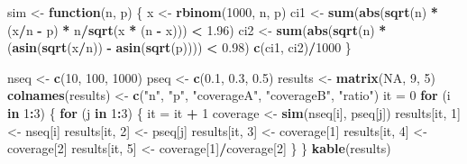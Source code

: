 \documentclass[12pt,]{article}
\newenvironment{Shaded}{\begin{snugshade}}{\end{snugshade}}
\newcommand{\ControlFlowTok}[1]{\textcolor[rgb]{0.13,0.29,0.53}{\textbf{#1}}}
\newcommand{\DecValTok}[1]{\textcolor[rgb]{0.00,0.00,0.81}{#1}}
\newcommand{\FloatTok}[1]{\textcolor[rgb]{0.00,0.00,0.81}{#1}}
\newcommand{\KeywordTok}[1]{\textcolor[rgb]{0.13,0.29,0.53}{\textbf{#1}}}
\newcommand{\NormalTok}[1]{#1}
\newcommand{\OperatorTok}[1]{\textcolor[rgb]{0.81,0.36,0.00}{\textbf{#1}}}
\newcommand{\OtherTok}[1]{\textcolor[rgb]{0.56,0.35,0.01}{#1}}
\newcommand{\StringTok}[1]{\textcolor[rgb]{0.31,0.60,0.02}{#1}}
\begin{document}
\begin{Shaded}
\begin{Highlighting}[]
\NormalTok{sim <-}\StringTok{ }\ControlFlowTok{function}\NormalTok{(n, p) \{}
\NormalTok{    x <-}\StringTok{ }\KeywordTok{rbinom}\NormalTok{(}\DecValTok{1000}\NormalTok{, n, p)}
\NormalTok{    ci1 <-}\StringTok{ }\KeywordTok{sum}\NormalTok{(}\KeywordTok{abs}\NormalTok{(}\KeywordTok{sqrt}\NormalTok{(n) }\OperatorTok{*}\StringTok{ }\NormalTok{(x}\OperatorTok{/}\NormalTok{n }\OperatorTok{-}\StringTok{ }\NormalTok{p) }\OperatorTok{*}\StringTok{ }\NormalTok{n}\OperatorTok{/}\KeywordTok{sqrt}\NormalTok{(x }\OperatorTok{*}\StringTok{ }
\StringTok{        }\NormalTok{(n }\OperatorTok{-}\StringTok{ }\NormalTok{x))) }\OperatorTok{<}\StringTok{ }\FloatTok{1.96}\NormalTok{)}
\NormalTok{    ci2 <-}\StringTok{ }\KeywordTok{sum}\NormalTok{(}\KeywordTok{abs}\NormalTok{(}\KeywordTok{sqrt}\NormalTok{(n) }\OperatorTok{*}\StringTok{ }\NormalTok{(}\KeywordTok{asin}\NormalTok{(}\KeywordTok{sqrt}\NormalTok{(x}\OperatorTok{/}\NormalTok{n)) }\OperatorTok{-}\StringTok{ }\KeywordTok{asin}\NormalTok{(}\KeywordTok{sqrt}\NormalTok{(p)))) }\OperatorTok{<}\StringTok{ }
\StringTok{        }\FloatTok{0.98}\NormalTok{)}
    \KeywordTok{c}\NormalTok{(ci1, ci2)}\OperatorTok{/}\DecValTok{1000}
\NormalTok{\}}

\NormalTok{nseq <-}\StringTok{ }\KeywordTok{c}\NormalTok{(}\DecValTok{10}\NormalTok{, }\DecValTok{100}\NormalTok{, }\DecValTok{1000}\NormalTok{)}
\NormalTok{pseq <-}\StringTok{ }\KeywordTok{c}\NormalTok{(}\FloatTok{0.1}\NormalTok{, }\FloatTok{0.3}\NormalTok{, }\FloatTok{0.5}\NormalTok{)}
\NormalTok{results <-}\StringTok{ }\KeywordTok{matrix}\NormalTok{(}\OtherTok{NA}\NormalTok{, }\DecValTok{9}\NormalTok{, }\DecValTok{5}\NormalTok{)}
\KeywordTok{colnames}\NormalTok{(results) <-}\StringTok{ }\KeywordTok{c}\NormalTok{(}\StringTok{"n"}\NormalTok{, }\StringTok{"p"}\NormalTok{, }\StringTok{"coverageA"}\NormalTok{, }\StringTok{"coverageB"}\NormalTok{, }
    \StringTok{"ratio"}\NormalTok{)}
\NormalTok{it =}\StringTok{ }\DecValTok{0}
\ControlFlowTok{for}\NormalTok{ (i }\ControlFlowTok{in} \DecValTok{1}\OperatorTok{:}\DecValTok{3}\NormalTok{) \{}
    \ControlFlowTok{for}\NormalTok{ (j }\ControlFlowTok{in} \DecValTok{1}\OperatorTok{:}\DecValTok{3}\NormalTok{) \{}
\NormalTok{        it =}\StringTok{ }\NormalTok{it }\OperatorTok{+}\StringTok{ }\DecValTok{1}
\NormalTok{        coverage <-}\StringTok{ }\KeywordTok{sim}\NormalTok{(nseq[i], pseq[j])}
\NormalTok{        results[it, }\DecValTok{1}\NormalTok{] <-}\StringTok{ }\NormalTok{nseq[i]}
\NormalTok{        results[it, }\DecValTok{2}\NormalTok{] <-}\StringTok{ }\NormalTok{pseq[j]}
\NormalTok{        results[it, }\DecValTok{3}\NormalTok{] <-}\StringTok{ }\NormalTok{coverage[}\DecValTok{1}\NormalTok{]}
\NormalTok{        results[it, }\DecValTok{4}\NormalTok{] <-}\StringTok{ }\NormalTok{coverage[}\DecValTok{2}\NormalTok{]}
\NormalTok{        results[it, }\DecValTok{5}\NormalTok{] <-}\StringTok{ }\NormalTok{coverage[}\DecValTok{1}\NormalTok{]}\OperatorTok{/}\NormalTok{coverage[}\DecValTok{2}\NormalTok{]}
\NormalTok{    \}}
\NormalTok{\}}
\KeywordTok{kable}\NormalTok{(results)}
\end{Highlighting}
\end{Shaded}
\end{document}
